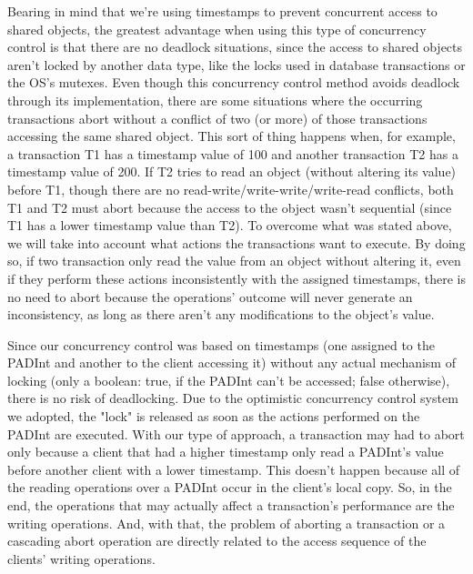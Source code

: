 \documentclass[times, 10pt,twocolumn]{article}
\begin{document}
Bearing in mind that we're using timestamps to prevent concurrent access to shared objects, the greatest advantage when using this type of concurrency control is that there are no deadlock situations, since the access to shared objects aren't locked by another data type, like the locks used in database transactions or the OS's mutexes.
Even though this concurrency control method avoids deadlock through its implementation, there are some situations where the occurring transactions abort without a conflict of two (or more) of those transactions accessing the same shared object. This sort of thing happens when, for example, a transaction T1 has a timestamp value of 100 and another transaction T2 has a timestamp value of 200. If T2 tries to read an object (without altering its value) before T1, though there are no read-write/write-write/write-read conflicts, both T1 and T2 must abort because the access to the object wasn't sequential (since T1 has a lower timestamp value than T2).
To overcome what was stated above, we will take into account what actions the transactions want to execute. By doing so, if two transaction only read the value from an object without altering it, even if they perform these actions inconsistently with the assigned timestamps, there is no need to abort because the operations' outcome will never generate an inconsistency, as long as there aren't any modifications to the object's value.

Since our concurrency control was based on timestamps (one assigned to the PADInt and another to the client accessing it) without any actual mechanism of locking (only a boolean: true, if the PADInt can't be accessed; false otherwise), there is no risk of deadlocking. Due to the optimistic concurrency control system we adopted, the "lock" is released as soon as the actions performed on the PADInt are executed.
With our type of approach, a transaction may had to abort only because a client that had a higher timestamp only read a PADInt's value before another client with a lower timestamp. This doesn't happen because all of the reading operations over a PADInt occur in the client's local copy. So, in the end, the operations that may actually affect a transaction's performance are the writing operations. And, with that, the problem of aborting a transaction or a cascading abort operation are directly related to the access sequence of the clients' writing operations.

\end{document}
